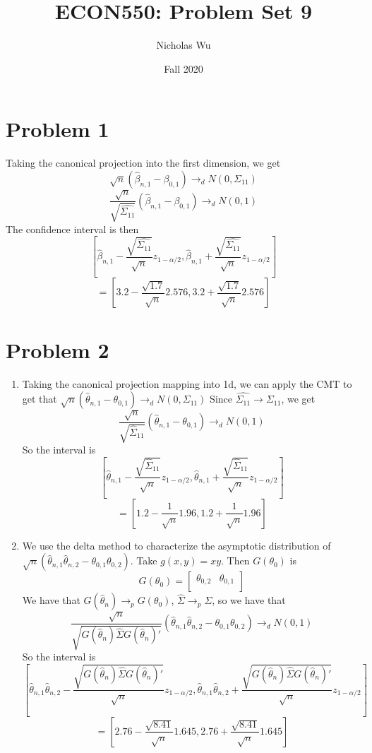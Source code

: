 \documentclass[10pt,letter]{article}
\begin{document}


\title{ECON550: Problem Set 9}

\author{Nicholas Wu}

\date{Fall 2020}

\maketitle
\section*{Problem 1}
Taking the canonical projection into the first dimension, we get
\[ \sqrt{n} \left( \hat{\beta}_{n,1} - \beta_{0,1} \right) \to_d N(0, \Sigma_{11}) \]
\[ \frac{\sqrt{n}}{\sqrt{\hat{\Sigma_{11}}}} \left( \hat{\beta}_{n,1} - \beta_{0,1} \right) \to_d N(0,1) \]
The confidence interval is then
\[ \left[\hat{\beta}_{n,1} - \frac{\sqrt{\hat{\Sigma_{11}}}}{\sqrt{n}}z_{1-\alpha/2},\hat{\beta}_{n,1} + \frac{\sqrt{\hat{\Sigma_{11}}}}{\sqrt{n}}z_{1-\alpha/2}  \right] \]
\[ = [3.2 - \frac{\sqrt{1.7}}{\sqrt{n}}2.576, 3.2 + \frac{\sqrt{1.7}}{\sqrt{n}}2.576 ] \]
\section*{Problem 2}
\begin{enumerate}[label=(\alph*)]
\item Taking the canonical projection mapping into 1d, we can apply the CMT to get that $\sqrt{n} (\hat{\theta}_{n,1} - \theta_{0,1}) \to_d N(0,\Sigma_{11})$
Since $\hat{\Sigma_{11}} \to \Sigma_{11}$, we get
\[ \frac{\sqrt{n}}{\sqrt{\hat{\Sigma}_{11}}} (\hat{\theta}_{n,1} - \theta_{0,1}) \to_d N(0, 1) \]
So the interval is
\[ \left[ \hat{\theta}_{n,1} - \frac{\sqrt{\hat{\Sigma}_{11}}}{\sqrt{n}}z_{1-\alpha/2},  \hat{\theta}_{n,1} + \frac{\sqrt{\hat{\Sigma}_{11}}}{\sqrt{n}}z_{1-\alpha/2} \right] \]
\[ =
 \left[ 1.2 - \frac{1}{\sqrt{n}}1.96,  1.2 + \frac{1}{\sqrt{n}}1.96 \right] \]
\item We use the delta method to characterize the asymptotic distribution of $\sqrt{n}\left(\hat{\theta}_{n,1} \hat{\theta}_{n,2} - \theta_{0,1} \theta_{0,2}\right)$. Take $g(x,y) = xy$. Then $G(\theta_0)$ is
\[ G(\theta_0) = \begin{bmatrix}
  \theta_{0,2} & \theta_{0,1} \\
\end{bmatrix}  \]
We have that $G(\hat{\theta}_n) \to_p G(\theta_0)$, $\hat{\Sigma} \to_p \Sigma$, so we have that
\[ \frac{\sqrt{n}}{\sqrt{G(\hat{\theta}_n)\hat{\Sigma}G(\hat{\theta}_n)' }}\left(\hat{\theta}_{n,1} \hat{\theta}_{n,2} - \theta_{0,1} \theta_{0,2}\right) \to_d N(0,1) \]
So the interval is
\[ \left[ \hat{\theta}_{n,1} \hat{\theta}_{n,2} - \frac{\sqrt{G(\hat{\theta}_n)\hat{\Sigma}G(\hat{\theta}_n)' }}{\sqrt{n}}z_{1-\alpha/2}, \hat{\theta}_{n,1} \hat{\theta}_{n,2} + \frac{\sqrt{G(\hat{\theta}_n)\hat{\Sigma}G(\hat{\theta}_n)' }}{\sqrt{n}}z_{1-\alpha/2} \right] \]
\[ = [2.76 - \frac{\sqrt{8.41}}{\sqrt{n}}1.645,2.76 + \frac{\sqrt{8.41}}{\sqrt{n}}1.645 ] \]
\end{enumerate}
\end{document}
